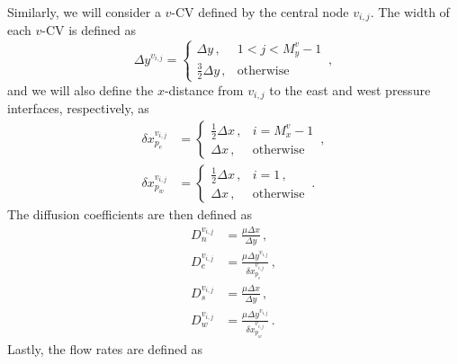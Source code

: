 \documentclass{article}
\begin{document}
Similarly, we will consider a $v$-CV defined by the central node $v_{i,j}$. The width of each $v$-CV is defined as
\begin{equation}
	\Delta y^{v_{i,j}} = \begin{cases}
		\Delta y \,, & 1 < j < M_y^v - 1 \\
		\frac{3}{2} \Delta y \,, & \text{otherwise}
	\end{cases}\,,
\end{equation}
and we will also define the $x$-distance from $v_{i,j}$ to the east and west pressure interfaces, respectively, as
\begin{subequations}
	\begin{align}
		\delta x^{v_{i,j}}_{p_e} & = \begin{cases}
			\frac{1}{2} \Delta x\,, & i = M_x^v - 1 \\
			\Delta x \,, & \text{otherwise}
		\end{cases}\,, \\
		\delta x^{v_{i,j}}_{p_w} & = \begin{cases}
			\frac{1}{2} \Delta x\,, & i = 1\,, \\
			\Delta x\,, & \text{otherwise}
		\end{cases}\,.
	\end{align}
\end{subequations}
The diffusion coefficients are then defined as
\begin{subequations}
	\begin{align}
		D_n^{v_{i,j}} & = \frac{\mu \Delta x}{\Delta y}\,,\\
		D_e^{v_{i,j}} & = \frac{\mu \Delta y^{v_{i,j}}}{\delta x^{v_{i,j}}_{p_e}}\,,\\
		D_s^{v_{i,j}} & = \frac{\mu \Delta x}{\Delta y}\,,\\
		D_w^{v_{i,j}} & = \frac{\mu\Delta y^{v_{i,j}}}{\delta x^{v_{i,j}}_{p_w}}\,.
	\end{align}
\end{subequations}
Lastly, the flow rates are defined as
\end{document}
